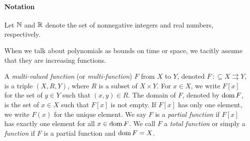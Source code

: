 \documentclass[envcountsect,envcountsame,orivec,oribibl]{llncs}
\newcommand{\pcolon}{\mathpunct{\,:\subseteq}}
\begin{document}


\paragraph{Notation}
Let $\mathbb N$ and $\mathbb R$ denote the set of nonnegative integers and 
real numbers, respectively.

When we talk about polynomials as bounds on time or space, 
we tacitly assume that they are increasing functions. 

A {\em multi-valued function} (or {\em multi-function}) $F$ from $X$ to $Y$,
denoted $F \pcolon X \rightrightarrows Y$,
is a triple $(X, R, Y)$, where $R$ is a subset of $X \times Y$.
For $x \in X$, we write $F[x]$ for the set of $y \in Y$ such that $(x,y) \in R$.
The domain of $F$, denoted by $\mathop{\rm dom} F$, is the set of $x \in X$ such that 
$F[x]$ is not empty.
If $F[x]$ has only one element, we write $F(x)$ for the unique element.
We say $F$ is a {\em partial function} if $F[x]$ has exactly one element for all
$x \in \mathop{\rm dom} F$.
We call $F$ a {\em total function} or simply a {\em function} 
if $F$ is a partial function and $\mathop{\rm dom} F = X$.

\end{document}

